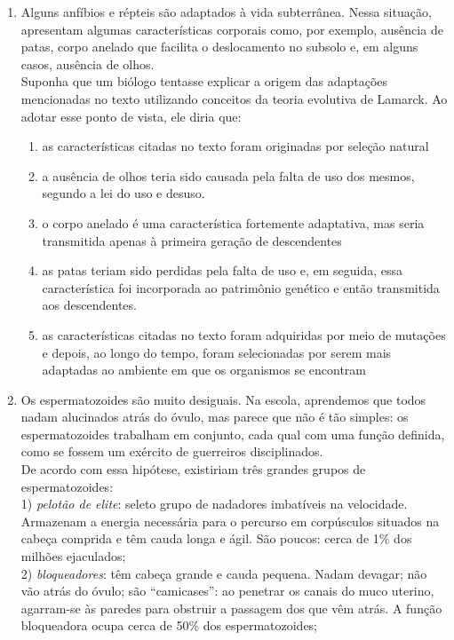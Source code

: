 \documentclass[10pt,a4paper]{article}
\begin{document}
\begin{multicols}{2}
\begin{enumerate}
	\item Alguns anf\'ibios e r\'epteis s\~ao adaptados \`a vida subterrânea. Nessa situa\c{c}\~ao, apresentam algumas caracter\'isticas corporais como, por exemplo, aus\^encia de patas, corpo anelado que facilita o deslocamento no subsolo e, em alguns casos, aus\^encia de olhos. \\
	Suponha que um bi\'ologo tentasse explicar a origem das adapta\c{c}\~oes mencionadas no texto utilizando conceitos da teoria evolutiva de Lamarck. Ao adotar esse ponto de vista, ele diria que:
		\begin{enumerate}
		\item as caracter\'isticas citadas no texto foram originadas por sele\c{c}\~ao natural
		\item a aus\^encia de olhos teria sido causada pela falta de uso dos mesmos, segundo a lei do uso e desuso.
		\item o corpo anelado \'e uma caracter\'istica fortemente adaptativa, mas seria transmitida apenas \`a primeira gera\c{c}\~ao de descendentes 
		\item as patas teriam sido perdidas pela falta de uso e, em seguida, essa caracter\'istica foi incorporada ao patrim\^onio gen\'etico e ent\~ao transmitida aos descendentes.
		\item as caracter\'isticas citadas no texto foram adquiridas por meio de muta\c{c}\~oes e depois, ao longo do tempo, foram selecionadas por serem mais adaptadas ao ambiente em que os organismos se encontram
		\end{enumerate}
	\item Os espermatozoides s\~ao muito desiguais. Na escola, aprendemos que todos nadam alucinados atr\'as do \'ovulo, mas parece que n\~ao \'e t\~ao simples: os espermatozoides trabalham em conjunto, cada qual com uma fun\c{c}\~ao definida, como se fossem um ex\'ercito de guerreiros disciplinados. \\
	De acordo com essa hip\'otese, existiriam tr\^es grandes grupos de espermatozoides: \\
	1) \emph{pelot\~ao de elite}: seleto grupo de nadadores imbat\'iveis na velocidade. Armazenam a energia necess\'aria para o percurso em corp\'usculos situados na cabe\c{c}a comprida e t\^em cauda longa e \'agil. S\~ao poucos: cerca de 1\% dos milh\~oes ejaculados; \\
	2) \emph{bloqueadores}: t\^em cabe\c{c}a grande e cauda pequena. Nadam devagar; n\~ao v\~ao atr\'as do \'ovulo; s\~ao “camicases”: ao penetrar os canais do muco uterino, agarram-se \`as paredes para obstruir a passagem dos que v\^em atr\'as. A fun\c{c}\~ao bloqueadora ocupa cerca de 50\% dos espermatozoides; \\

\end{enumerate}
\end{multicols}
\end{document}
